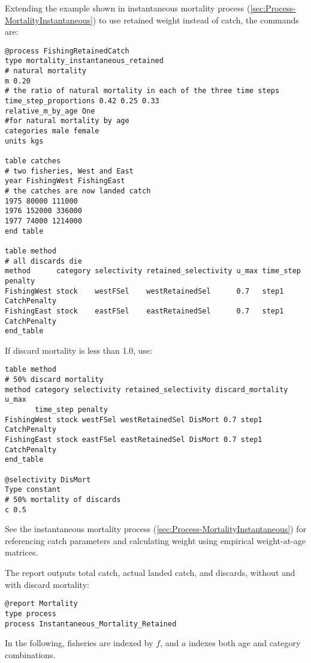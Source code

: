 Extending the example shown in instantaneous mortality process (\ref{sec:Process-MortalityInstantaneous}) to use retained weight instead of catch, the commands are:

{\small{\begin{verbatim}
@process FishingRetainedCatch
type mortality_instantaneous_retained
# natural mortality
m 0.20
# the ratio of natural mortality in each of the three time steps
time_step_proportions 0.42 0.25 0.33
relative_m_by_age One
#for natural mortality by age
categories male female
units kgs

table catches
# two fisheries, West and East
year FishingWest FishingEast
# the catches are now landed catch
1975 80000 111000
1976 152000 336000
1977 74000 1214000
end table

table method
# all discards die
method      category selectivity retained_selectivity u_max time_step penalty
FishingWest stock    westFSel    westRetainedSel      0.7   step1     CatchPenalty
FishingEast stock    eastFSel    eastRetainedSel      0.7   step1     CatchPenalty
end_table
\end{verbatim}}}

If discard mortality is less than 1.0, use:

{\small{\begin{verbatim}
table method
# 50% discard mortality
method category selectivity retained_selectivity discard_mortality u_max 
       time_step penalty
FishingWest stock westFSel westRetainedSel DisMort 0.7 step1 CatchPenalty
FishingEast stock eastFSel eastRetainedSel DisMort 0.7 step1 CatchPenalty
end_table

@selectivity DisMort
Type constant
# 50% mortality of discards
c 0.5
\end{verbatim}}}

See the instantaneous mortality process (\ref{sec:Process-MortalityInstantaneous}) for referencing catch parameters and calculating weight using empirical weight-at-age matrices.

The report outputs total catch, actual landed catch, and discards, without and with discard mortality:

{\small{\begin{verbatim}
@report Mortality
type process
process Instantaneous_Mortality_Retained
\end{verbatim}}}


In the following, fisheries are indexed by $f$, and $a$ indexes both age and category combinations.

